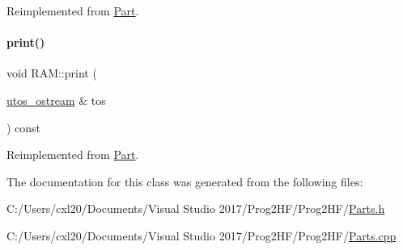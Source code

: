 Reimplemented from \mbox{\hyperlink{class_part_a4fa402b8e8fd4236ff773a7697ab2bc3}{Part}}.

\mbox{\label{class_r_a_m_a11a874dd6cf99454efd6b7a1d20a3737}} 
\paragraph{\texorpdfstring{print()}{print()}\hspace{0.1cm}{\footnotesize\ttfamily [2/2]}}
{\footnotesize\ttfamily void R\+A\+M\+::print (\begin{DoxyParamCaption}\item[{\mbox{\hyperlink{structutos__ostream}{utos\+\_\+ostream}} \&}]{tos }\end{DoxyParamCaption}) const\hspace{0.3cm}{\ttfamily [virtual]}}



Reimplemented from \mbox{\hyperlink{class_part_a9ecabe44ba3415badf82c6a23617a41e}{Part}}.



The documentation for this class was generated from the following files\+:\begin{DoxyCompactItemize}
\item 
C\+:/\+Users/cxl20/\+Documents/\+Visual Studio 2017/\+Prog2\+H\+F/\+Prog2\+H\+F/\mbox{\hyperlink{_parts_8h}{Parts.\+h}}\item 
C\+:/\+Users/cxl20/\+Documents/\+Visual Studio 2017/\+Prog2\+H\+F/\+Prog2\+H\+F/\mbox{\hyperlink{_parts_8cpp}{Parts.\+cpp}}\end{DoxyCompactItemize}
